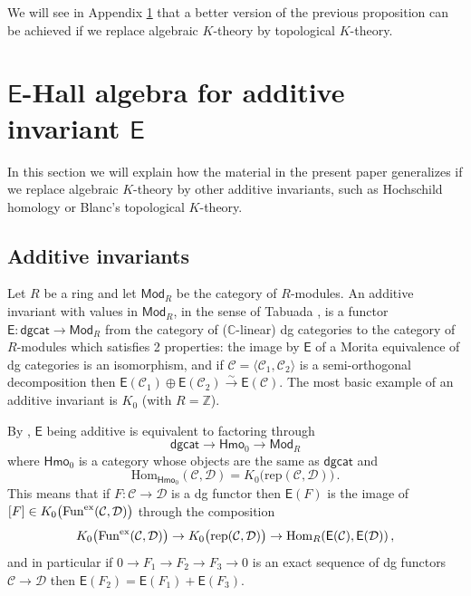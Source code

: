 \documentclass[12pt]{amsart}
\theoremstyle{definition}
\newtheorem{remark}[definition]{Remark}
\newcommand{\sE}{\mathsf{E}}
\newcommand{\BC}{{\mathbb{C}}}
\newcommand{\BZ}{{\mathbb{Z}}}
\newcommand{\CC}{{\mathcal C}}
\newcommand{\CD}{{\mathcal D}}
\newcommand{\1}{\mathbf 1}
\newcommand{\FM}{{\mathfrak{M}}}
\newcommand{\Hom}{\mathrm{Hom}}
\begin{document}
We will see in Appendix \ref{appendix} that a better version of the previous proposition can be achieved if we replace algebraic $K$-theory by topological $K$-theory.

\appendix

\section{$\sE$-Hall algebra for additive invariant $\sE$}
\label{appendix}

In this section we will explain how the material in the present paper generalizes if we replace algebraic $K$-theory by other additive invariants, such as Hochschild homology or Blanc's topological $K$-theory.

\subsection{Additive invariants}

Let $R$ be a ring and let $\mathsf{Mod}_R$ be the category of $R$-modules. An additive invariant with values in $\mathsf{Mod}_R$, in the sense of Tabuada \cite{tabuadaadditifs}, is a functor $\sE\colon \mathsf{dgcat}\to \mathsf{Mod}_R$ from the category of ($\BC$-linear) dg categories to the category of $R$-modules which satisfies 2 properties: the image by $\sE$ of a Morita equivalence of dg categories is an isomorphism, and if $\mathcal C=\langle \mathcal C_1, \mathcal C_2\rangle$ is a semi-orthogonal decomposition then $\sE(\CC_1)\oplus \sE(\CC_2)\xrightarrow{\sim} \sE(\CC)$. The most basic example of an additive invariant is $K_0$ (with $R=\BZ$). 




By \cite[Théorème 6.1.]{tabuadaadditifs}, $\sE$ being additive is equivalent to factoring through
\[\mathsf{dgcat}\to \mathsf{Hmo}_0\to \mathsf{Mod}_R\]
where $\mathsf{Hmo}_0$ is a category whose objects are the same as $\mathsf{dgcat}$ and 
\[\Hom_{\mathsf{Hmo}_0}(\CC, \CD)=K_0\big(\mathrm{rep}(\CC, \CD)\big)\,.\]
This means that if $F\colon \CC\to \CD$ is a dg functor then $\sE(F)$ is the image of $[F]\in K_0\big(\mathrm{Fun}^{\textup{ex}}(\CC, \CD)\big)$ through the composition
\[K_0\big(\mathrm{Fun}^{\textup{ex}}(\CC, \CD)\big)\to K_0\big(\mathrm{rep}(\CC, \CD)\big)\to \mathrm{Hom}_{R}(\sE(\CC), \sE(\CD))\,,\]
and in particular if $0\to F_1\to F_2\to F_3\to 0$ is an exact sequence of dg functors $\CC\to \CD$ then $\sE(F_2)=\sE(F_1)+\sE(F_3)$. 
\end{document}
